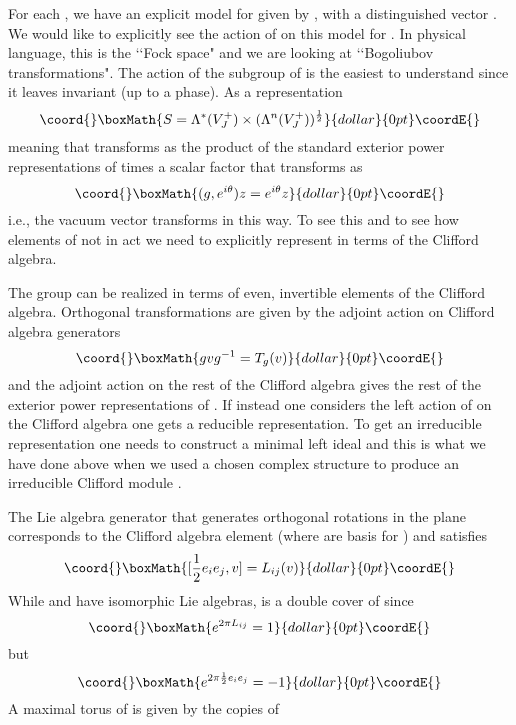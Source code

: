 \documentclass[a4paper,a4paper]{article}
\theoremstyle{conjecture}
\begin{document}
For each \coordHE{}, we have an explicit model for \coordHE{} given by
\coordHE{}, with a distinguished vector \coordHE{}. We
would like to explicitly see the action of \coordHE{} on this
model for \coordHE{}.  In physical language, this is the \lq\lq Fock
space" and we are looking at \lq\lq Bogoliubov transformations".
The action of the subgroup \coordHE{} of \coordHE{} is the
easiest to understand since it leaves \coordHE{} invariant (up to
a phase).  As a \coordHE{} representation
$$\coord{}\boxMath{S=\Lambda^*(V^+_J)\times (\Lambda^{n}(V^+_J))^{\frac{1}{2}}}{dollar}{0pt}\coordE{}$$
meaning that \coordHE{} transforms as the product of the standard
exterior power representations of \coordHE{} times a scalar factor
that transforms as
$$\coord{}\boxMath{ (g,e^{i\theta})z=e^{i\theta}z}{dollar}{0pt}\coordE{}$$
i.e., the vacuum vector \coordHE{} transforms in this way. To see
this and to see how elements of \coordHE{} not in
\coordHE{} act we need to explicitly represent \coordHE{}
in terms of the Clifford algebra.

The group \coordHE{} can be realized in terms of even, invertible
elements \coordHE{} of the Clifford algebra.  Orthogonal transformations
\coordHE{} are given by the adjoint action on Clifford algebra
generators
$$\coord{}\boxMath{gvg^{-1}=T_g(v)}{dollar}{0pt}\coordE{}$$
and the adjoint action on the rest of the Clifford algebra gives
the rest of the exterior power representations of \coordHE{}.
If instead one considers the left action of \coordHE{} on the Clifford
algebra one gets a reducible representation.  To get an irreducible
representation one needs to construct a minimal left ideal and
this is what we have done above when we used a chosen complex
structure \coordHE{} to produce an irreducible Clifford module \coordHE{}.

The Lie algebra generator \coordHE{} that generates orthogonal rotations
in the \coordHE{} plane corresponds to the Clifford algebra element
\coordHE{} (where \coordHE{} are basis for \coordHE{}) and satisfies
$$\coord{}\boxMath{[\frac{1}{2}e_ie_j,v] = L_{ij}(v)}{dollar}{0pt}\coordE{}$$
While \coordHE{} and \coordHE{} have isomorphic Lie algebras, \coordHE{} is
a double cover of \coordHE{} since
$$\coord{}\boxMath{e^{2\pi L_{ij}}=1}{dollar}{0pt}\coordE{}$$
but
$$\coord{}\boxMath{e^{2\pi\frac{1}{2}e_ie_j} = -1}{dollar}{0pt}\coordE{}$$
A maximal torus \coordHE{} of \coordHE{} is given by the \coordHE{} copies of \coordHE{}
\end{document}
